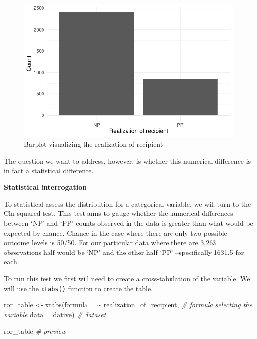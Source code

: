 \documentclass[
  letterpaper,
]{latex/krantz}
\newenvironment{Shaded}{\begin{snugshade}}{\end{snugshade}}
\newcommand{\AttributeTok}[1]{\textcolor[rgb]{0.00,0.00,0.00}{#1}}
\newcommand{\CommentTok}[1]{\textcolor[rgb]{0.00,0.00,0.00}{\textit{#1}}}
\newcommand{\FunctionTok}[1]{\textcolor[rgb]{0.00,0.00,0.00}{#1}}
\newcommand{\NormalTok}[1]{\textcolor[rgb]{0.00,0.00,0.00}{#1}}
\newcommand{\OtherTok}[1]{\textcolor[rgb]{0.00,0.00,0.00}{#1}}
\newcommand{\SpecialCharTok}[1]{\textcolor[rgb]{0.00,0.00,0.00}{#1}}
\begin{document}
\begin{figure}[h]

{\centering \includegraphics{inference_files/figure-pdf/figi-uni-cat-visual-dative-1.pdf}

}

\caption{Barplot visualizing the realization of recipient}

\end{figure}

The question we want to address, however, is whether this numerical
difference is in fact a statistical difference.

\textbf{Statistical interrogation}

To statistical assess the distribution for a categorical variable, we
will turn to the Chi-squared test. This test aims to gauge whether the
numerical differences between `NP' and `PP' counts observed in the data
is greater than what would be expected by chance. Chance in the case
where there are only two possible outcome levels is 50/50. For our
particular data where there are 3,263 observations half would be `NP'
and the other half `PP' --specifically 1631.5 for each.

To run this test we first will need to create a cross-tabulation of the
variable. We will use the \texttt{xtabs()} function to create the table.

\begin{Shaded}
\begin{Highlighting}[]
\NormalTok{ror\_table }\OtherTok{\textless{}{-}} 
  \FunctionTok{xtabs}\NormalTok{(}\AttributeTok{formula =} \SpecialCharTok{\textasciitilde{}}\NormalTok{ realization\_of\_recipient, }\CommentTok{\# formula selecting the variable}
        \AttributeTok{data =}\NormalTok{ dative) }\CommentTok{\# dataset}

\NormalTok{ror\_table }\CommentTok{\# preview}
\end{Highlighting}
\end{Shaded}
\end{document}
